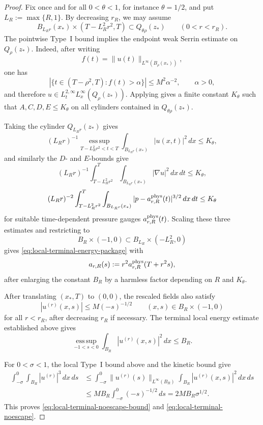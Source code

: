 \documentclass[11pt]{amsart}
\numberwithin{equation}{section}
\theoremstyle{plain}
\theoremstyle{definition}
\theoremstyle{remark}
\newcommand{\esssup}{\operatorname*{ess\,sup}}
\begin{document}
\begin{proof}
Fix once and for all \(0<\theta<1\), for instance \(\theta=1/2\), and put
\(L_R:=\max\{R,1\}\).  By decreasing \(r_R\), we may assume
\[
   B_{L_Rr}(x_*)\times(T-L_R^2r^2,T)\subset Q_{\theta\rho}(z_*)
   \qquad (0<r<r_R).
\]
The pointwise Type~I bound implies the endpoint weak Serrin estimate on
\(Q_\rho(z_*)\).  Indeed, after writing
\[
   f(t)=\|u(t)\|_{L^\infty(B_\rho(x_*))},
\]
one has
\[
   |\{t\in(T-\rho^2,T): f(t)>\alpha\}|
   \le M^2\alpha^{-2},
   \qquad \alpha>0,
\]
and therefore \(u\in L^{2,\infty}_tL^\infty_x(Q_\rho(z_*))\).  Applying
 gives a finite constant \(K_\theta\)
such that \(A,C,D,E\le K_\theta\) on all cylinders contained in
\(Q_{\theta\rho}(z_*)\).

Taking the cylinder \(Q_{L_Rr}(z_*)\) gives
\[
   (L_Rr)^{-1}
   \esssup_{T-L_R^2r^2<t<T}
      \int_{B_{L_Rr}(x_*)}|u(x,t)|^2\,dx
   \le K_\theta ,
\]
and similarly the \(D\)- and \(E\)-bounds give
\[
   (L_Rr)^{-1}\int_{T-L_R^2r^2}^{T}
      \int_{B_{L_Rr}(x_*)}|\nabla u|^2\,dx\,dt
   \le K_\theta ,
\]
\[
   (L_Rr)^{-2}\int_{T-L_R^2r^2}^{T}
      \int_{B_{L_Rr}(x_*)}|p-a_{r,R}^{\rm phys}(t)|^{3/2}\,dx\,dt
   \le K_\theta
\]
for suitable time-dependent pressure gauges \(a_{r,R}^{\rm phys}(t)\).  Scaling
these three estimates and restricting to
\[
   B_R\times(-1,0)\subset B_{L_R}\times(-L_R^2,0)
\]
gives \eqref{eq:local-terminal-energy-package} with
\[
   a_{r,R}(s):=r^2a_{r,R}^{\rm phys}(T+r^2s),
\]
after enlarging the constant \(B_R\) by a harmless factor depending on \(R\)
and \(K_\theta\).

After translating \((x_*,T)\) to \((0,0)\), the rescaled fields also satisfy
\[
   |u^{(r)}(x,s)|\le M(-s)^{-1/2}
   \qquad (x,s)\in B_R\times(-1,0)
\]
for all \(r<r_R\), after decreasing \(r_R\) if necessary.  The terminal local
energy estimate established above gives
\[
   \esssup_{-1<s<0}\int_{B_R}|u^{(r)}(x,s)|^2\,dx\le B_R .
\]

For \(0<\sigma<1\), the local Type~I bound above and the kinetic bound give
\[
\begin{aligned}
  \int_{-\sigma}^{0}\int_{B_R}|u^{(r)}|^3\,dx\,ds
  &\le
  \int_{-\sigma}^{0}
     \|u^{(r)}(s)\|_{L^\infty(B_R)}
     \int_{B_R}|u^{(r)}(x,s)|^2\,dx\,ds  \\
  &\le
  MB_R\int_{-\sigma}^{0}(-s)^{-1/2}\,ds
  =
  2MB_R\sigma^{1/2}.
\end{aligned}
\]
This proves \eqref{eq:local-terminal-noescape-bound} and
\eqref{eq:local-terminal-noescape}.
\end{proof}
\end{document}
